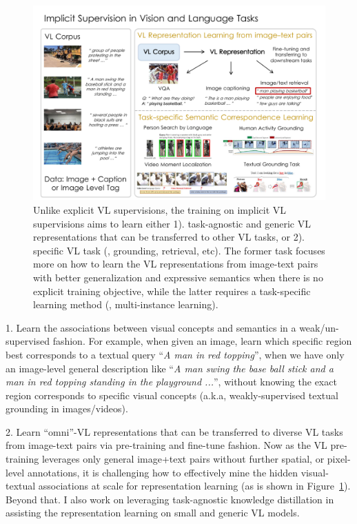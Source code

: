 \begin{figure}
\begin{center}
\includegraphics[width=.99\textwidth]{images/implicit_training.pdf}
\end{center}
\caption[VL Representation Learning \vs Downstream VL tasks.]{Unlike explicit VL supervisions, the training on implicit VL supervisions aims to learn either 1). task-agnostic and generic VL representations that can be transferred to other VL tasks, or 2). specific VL task (\eg, grounding, retrieval, etc). The former task focuses more on how to learn the VL representations from image-text pairs with better generalization and expressive semantics when there is no explicit training objective, while the latter requires a task-specific learning method (\eg, multi-instance learning).
}
\label{fig:implicit_learning}
\end{figure}

1. Learn the associations between visual concepts and semantics in a weak/un-supervised fashion. For example, when given an image, learn which specific region best corresponds to a textual query ``\textit{A man in red topping}'', when we have only an image-level general description like ``\textit{A man swing the base ball stick and a man in red topping standing in the playground ...}'', without knowing the exact region corresponds to specific visual concepts (a.k.a, weakly-supervised textual grounding in images/videos).

2. Learn ``omni''-VL representations that can be transferred to diverse VL tasks from image-text pairs via pre-training and fine-tune fashion. Now as the VL pre-training leverages only general image+text pairs without further spatial, or pixel-level annotations, it is challenging how to effectively mine the hidden visual-textual associations at scale for representation learning (as is shown in Figure~\ref{fig:implicit_learning}). Beyond that. I also work on leveraging task-agnostic knowledge distillation in assisting the representation learning on small and generic VL models. 

